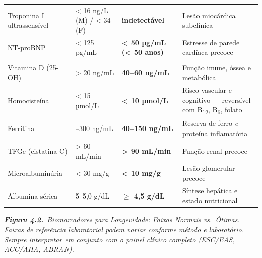 {\begin{longtable}{@{}>{\raggedright\arraybackslash}p{}>{\raggedright\arraybackslash}p{}>{\raggedright\arraybackslash}p{}>{\raggedright\arraybackslash}p{}@{}}
Troponina I ultrassensível & < 16 ng/L (M) / < 34 (F) & \textbf{indetectável} & Lesão miocárdica subclínica \\
NT-proBNP & < 125 pg/mL & \textbf{< 50 pg/mL (< 50 anos)} & Estresse de parede cardíaca precoce \\
\addlinespace[0.4em]
\multicolumn{4}{@{}l}{\textcolor{petrol}{\textbf{4.\ Regulação e longevidade}}} \\
\addlinespace[0.2em]
Vitamina D (25-OH) & > 20 ng/mL & \textbf{40--60 ng/mL} & Função imune, óssea e metabólica \\
Homocisteína & < 15 µmol/L & \textbf{< 10 µmol/L} & Risco vascular e cognitivo — reversível com B\textsubscript{12}, B\textsubscript{6}, folato \\
Ferritina & 12--300 ng/mL & \textbf{40--150 ng/mL} & Reserva de ferro \emph{e} proteína inflamatória \\
TFGe (cistatina C) & > 60 mL/min & \textbf{> 90 mL/min} & Função renal precoce \\
Microalbuminúria & < 30 mg/g & \textbf{< 10 mg/g} & Lesão glomerular precoce \\
Albumina sérica & 3{,}5--5{,}0 g/dL & \textbf{$\geq$ 4{,}5 g/dL} & Síntese hepática e estado nutricional \\
\bottomrule
\end{longtable}
}

\smallskip
{\footnotesize\itshape\color{ink}\noindent%
\textbf{Figura 4.2.}\ Biomarcadores para Longevidade: Faixas Normais vs.\ Ótimas.
Faixas de referência laboratorial podem variar conforme método e laboratório.
Sempre interpretar em conjunto com o painel clínico completo (ESC/EAS, ACC/AHA, ABRAN).\par}
\endgroup

\bigskip
